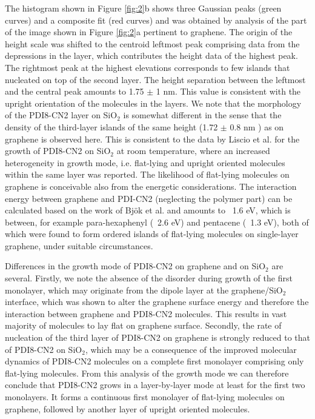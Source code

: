\documentclass[preprint,aip,jap]{revtex4-2}
\begin{document}
The histogram shown in Figure \ref{fig:2}b shows three Gaussian peaks (green curves) and a composite fit (red curves) and was obtained by analysis of the part of the image shown in Figure \ref{fig:2}a pertinent to graphene. The origin of the height scale was shifted to the centroid leftmost peak comprising data from the depressions in the layer, which contributes the height data of the highest peak. The rightmost peak at the highest elevations corresponds to few islands that nucleated on top of the second layer. The height separation between the leftmost and the central peak amounts to 1.75 $\pm$ 1 nm. This value is consistent with the upright orientation of the molecules in the layers. We note that the morphology of the PDI8-CN2 layer on SiO$_{2}$ is somewhat different in the sense that the density of the third-layer islands  of the same height (1.72 $\pm$ 0.8 nm ) as on graphene is observed here. This is consistent to the data by Liscio et al. for the growth of PDI8-CN2 on SiO$_{2}$ at room temperature, where an increased heterogeneity in growth mode, i.e. flat-lying and upright oriented molecules within the same layer was reported. The likelihood of flat-lying molecules on graphene is conceivable also from the energetic considerations. The interaction energy between graphene and PDI-CN2 (neglecting the polymer part) can be calculated based on the work of Bj\"{o}k et al.\cite{bjork-2010} and amounts to ~1.6 eV, which is between, for example para-hexaphenyl (~2.6 eV) and pentacene (~1.3 eV), both of which were found to form ordered islands of flat-lying molecules on single-layer graphene, under suitable circumstances\cite{kratzer-2016}.

Differences in the growth mode of PDI8-CN2 on graphene and on SiO$_{2}$ are several. Firstly, we note the absence of the disorder during growth of the first monolayer, which may originate from the dipole layer at the graphene/SiO$_{2}$ interface, which was shown to alter the graphene surface energy and therefore the interaction between graphene and PDI8-CN2 molecules\cite{sabio-2008,chhikara-2014}. This results in vast majority of molecules to lay flat on graphene surface\cite{kratzer-2016}.  Secondly, the rate of nucleation of the third layer of PDI8-CN2 on graphene is strongly reduced to that of PDI8-CN2 on SiO$_{2}$, which may be a consequence of the improved molecular dynamics of PDI8-CN2 molecules on a complete first monolayer comprising only flat-lying molecules.   From this analysis of the growth mode we can therefore conclude that PDI8-CN2 grows in a layer-by-layer mode at least for the first two monolayers. It forms a continuous first monolayer of flat-lying molecules on graphene, followed by another layer of upright oriented molecules.
\end{document}
